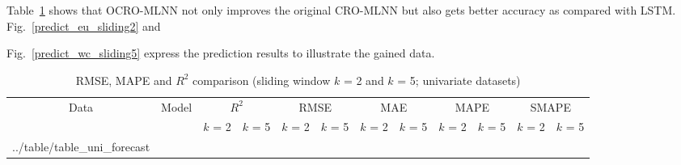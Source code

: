 \documentclass[smallcondensed, natbib]{svjour3}     %
\makeatletter
\newcommand\primitiveinput[1]
		{\@@input #1 }
\makeatother
\begin{document}
Table~\ref{table:uni_forecast} shows that OCRO-MLNN not only improves the original CRO-MLNN but also gets better accuracy as compared with LSTM. Fig.~\ref{predict_eu_sliding2} and {Fig.~\ref{predict_wc_sliding5} express the prediction results to illustrate the gained data. 

\begin{table}[!h]
	\caption{RMSE, MAPE and $R^2$ comparison (sliding window $k$ = 2 and $k$ = 5; univariate datasets)}
	\label{table:uni_forecast}
	\centering
	\begin{adjustbox}{width=\textwidth}
		\begin{tabular}{| c | c | c | c | c | c | c | c | c | c | c | c |}%
			\hline
			\multirow{2}{*}{Data} & \multirow{2}{*}{Model} & \multicolumn{2}{c|}{$R^2$} & \multicolumn{2}{c|}{RMSE} & \multicolumn{2}{c|}{MAE} & \multicolumn{2}{c|}{MAPE}  & \multicolumn{2}{c|}{SMAPE} \\ \cline{3-12}
   				& & $k$ = 2 & $k$ = 5 & $k$ = 2 & $k$ = 5 & $k$ = 2 & $k$ = 5 & $k$ = 2 & $k$ = 5 & $k$ = 2 & $k$ = 5 \\ [0.5ex] 
			\hline
			\primitiveinput{../table/table_uni_forecast}
			\hline
		\end{tabular}
	\end{adjustbox}
\end{table}



}
\end{document}
